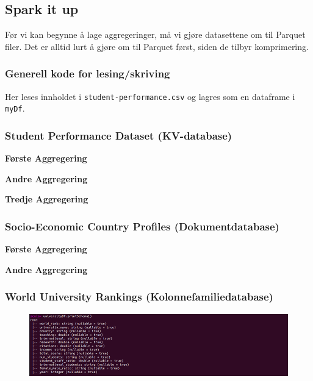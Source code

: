 \subsection{Spark it up}
Før vi kan begynne å lage aggregeringer, må vi gjøre datasettene om til Parquet filer. Det er alltid lurt å gjøre om til Parquet først, siden de tilbyr komprimering.

\subsubsection{Generell kode for lesing/skriving}
Her leses innholdet i \lstinline{student-performance.csv} og lagres som en dataframe i \lstinline{myDf}.


\subsubsection{Student Performance Dataset (KV-database)}
\textbf{Første Aggregering}\\


\textbf{Andre Aggregering}\\

\textbf{Tredje Aggregering}\\

\subsubsection{Socio-Economic Country Profiles (Dokumentdatabase)}
\textbf{Første Aggregering}\\

\textbf{Andre Aggregering}\\

\subsubsection{World University Rankings (Kolonnefamiliedatabase)}


\FigureCounter
\begin{figure}[H]
    \includegraphics[width=\textwidth]{images/milepael5/printSchema.png}
\end{figure}

